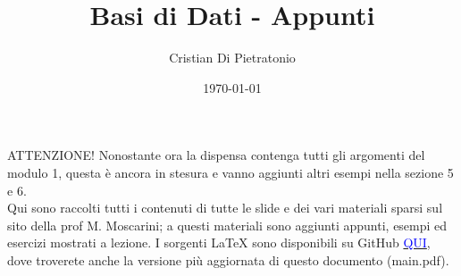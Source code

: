 \documentclass[a4paper,10pt]{article}
\title{\Huge Basi di Dati - Appunti}
\author{Cristian Di Pietratonio}
\date{\today}
\begin{document}
\maketitle

ATTENZIONE! Nonostante ora la dispensa contenga tutti gli argomenti del modulo 1, questa è ancora in 
stesura e vanno aggiunti altri esempi nella sezione 5 e 6.\\ 
Qui sono raccolti tutti i contenuti di tutte le slide e dei vari materiali sparsi sul sito della 
prof M. Moscarini; a questi materiali sono aggiunti appunti, esempi ed esercizi mostrati a lezione. 
I sorgenti LaTeX sono disponibili su GitHub 
\href{https://github.com/Halolegend94/uni_database_appunti}{\textcolor{blue}{QUI}}, dove troverete 
anche la versione più aggiornata di questo documento (main.pdf).

\newpage
\setcounter{tocdepth}{3}
\tableofcontents
\newpage

\newpage

\newpage

\newpage

\newpage

\newpage

\end{document}
